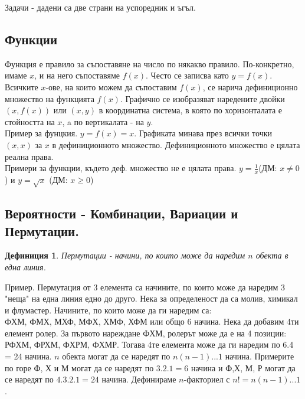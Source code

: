 \documentclass{article}
\newtheorem{definition}{Дефиниция}
\begin{document}
Задачи - дадени са две страни на успоредник и ъгъл.

\subsection{Функции}
Функция е правило за съпоставяне на число по някакво правило. По-конкретно, имаме $x$, и на него съпоставяме $f(x)$.
Често се записва като $ y = f(x) $. Всичките $x$-ове, на които можем да съпоставим $f(x)$, се нарича дефиниционно множество на функцията $f(x)$. Графично се изобразяват наредените двойки $(x, f(x)) $ или $(x,y)$ в координатна система, в която по хоризонталата е стойността на $x$, a по вертикалата - на $y$.\\
Пример за фунцкия. $y =f(x) = x$.
Графиката минава през всички точки $(x,x)$ за $x$ в дефиниционното множество. Дефиниционното множество е цялата реална права. \\
Примери за функции, където деф. множество не е цялата права.
$y = \frac{1}{x}$(ДМ: $x \neq 0 $) и $y = \sqrt x$ (ДМ: $x \geq 0$)


\subsection{Вероятности - Комбинации, Вариации и Пермутации.}

\begin{definition}
	Пермутации - начини, по които може да наредим $n$ обекта в една линия.
\end{definition}
Пример. Пермутация от 3 елемента са начините, по които може да наредим 3 "неща" на една линия едно до друго. Нека за определеност да са молив, химикал и флумастер. Начините, по които може да ги наредим са: \\
ФХМ, ФМХ, МХФ, МФХ, ХМФ, ХФМ или общо 6 начина. Нека да добавим 4ти елемент ролер. За първото нареждане ФХМ, ролерът може да е на 4 позиции:
РФХМ, ФРХМ, ФХРМ, ФХМР. Тогава 4те елемента може да ги наредим по 6.4 = 24 начина. $n$ обекта могат да се наредят по $n(n-1)...1$ начина. 
Примерите по горе Ф, Х и М могат да се наредят по $3.2.1 =6 $ начина и Ф,Х, М, Р могат да се наредят по $4.3.2.1 = 24$ начина. Дефинираме $n$-факториел с $n! = n(n-1)...1$.

\end{document}
